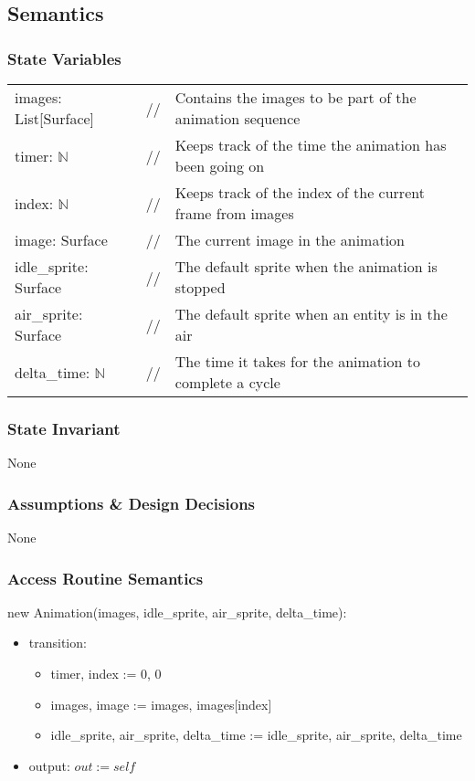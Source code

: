 \documentclass[12pt]{article}
\begin{document}
\subsection* {Semantics}

\subsubsection* {State Variables}

\begin{tabular}{lll}
    images: List[Surface] & // & Contains the images to be part of the animation sequence\\
    timer: $\mathbb{N}$ & // & Keeps track of the time the animation has been going on\\
    index: $\mathbb{N}$ & // & Keeps track of the index of the current frame from images\\
    image: Surface & // & The current image in the animation\\
    idle\_sprite: Surface & // & The default sprite when the animation is stopped\\
    air\_sprite: Surface & // & The default sprite when an entity is in the air\\
    delta\_time: $\mathbb{N}$ & // & The time it takes for the animation to complete a cycle\\
\end{tabular}

\subsubsection* {State Invariant}

None

\subsubsection* {Assumptions \& Design Decisions}

None

\subsubsection* {Access Routine Semantics}

new Animation(images, idle\_sprite, air\_sprite, delta\_time):
\begin{itemize}
    \item transition: 
    \begin{itemize}[]
        \item timer, index := 0, 0
        \item images, image := images, images[index]
        \item idle\_sprite, air\_sprite, delta\_time := idle\_sprite, air\_sprite, delta\_time
    \end{itemize}
    \item output: $out := self$
\end{itemize}
\end{document}
